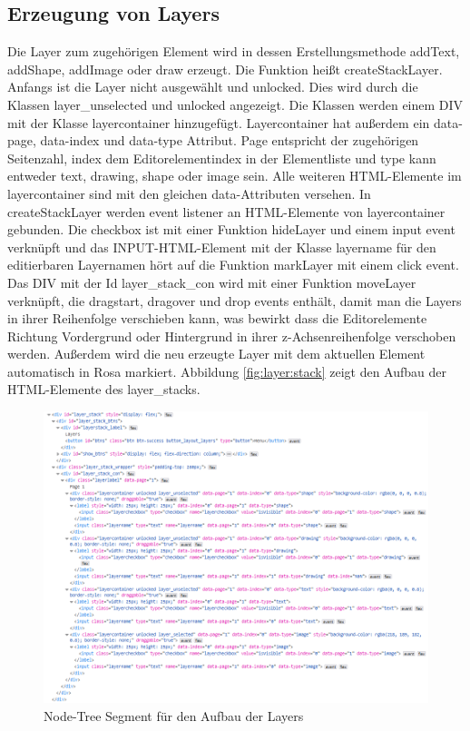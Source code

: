 \subsection{Erzeugung von Layers}
Die Layer zum zugehörigen Element wird in dessen Erstellungsmethode addText, addShape, addImage oder draw erzeugt. Die Funktion heißt createStackLayer. Anfangs ist die Layer nicht ausgewählt und unlocked. Dies wird durch die Klassen layer\_unselected und unlocked angezeigt. Die Klassen werden einem DIV mit der Klasse layercontainer hinzugefügt. Layercontainer hat außerdem ein data-page, data-index und data-type Attribut. Page entspricht der zugehörigen Seitenzahl, index dem Editorelementindex in der Elementliste und type kann entweder text, drawing, shape oder image sein. Alle weiteren HTML-Elemente im layercontainer sind mit den gleichen data-Attributen versehen. In createStackLayer werden event listener an HTML-Elemente von layercontainer gebunden. Die checkbox ist mit einer Funktion hideLayer und einem input event verknüpft und das INPUT-HTML-Element mit der Klasse layername für den editierbaren Layernamen hört auf die Funktion markLayer mit einem click event. Das DIV mit der Id layer\_stack\_con wird mit einer Funktion moveLayer verknüpft, die dragstart, dragover und drop events enthält, damit man die Layers in ihrer Reihenfolge verschieben kann, was bewirkt dass die Editorelemente Richtung Vordergrund oder Hintergrund in ihrer z-Achsenreihenfolge verschoben werden. Außerdem wird die neu erzeugte Layer mit dem aktuellen Element automatisch in Rosa markiert. Abbildung \ref{fig:layer:stack} zeigt den Aufbau der HTML-Elemente des layer\_stacks.

\begin{figure}[!htbp]
	\centering
	\includegraphics[width=1\textwidth]{"images/layer-stack.png"}
	\caption{Node-Tree Segment für den Aufbau der Layers}
	\label{fig:layer-stack}
\end{figure}

